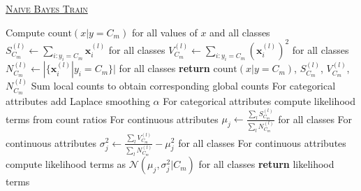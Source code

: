 \documentclass[10pt]{article}
\begin{document}
\begin{algorithm}
	\caption{\underline{\textsc{Naive Bayes Train}}}
	\label{naivebayes_train}
	\begin{algorithmic}[1] %
		 
					\State Compute $\text{count}(x| y=C_m)$ for all values of $x$ and all classes
					\State $S_{C_m}^{(l)} \gets \sum_{i:y_i=C_m} \mathbf{x}^{(l)}_{i}$ for all classes
					\State $V_{C_m}^{(l)} \gets \sum_{i:y_i=C_m} {(\mathbf{x}^{(l)}_{i})}^2$ for all classes
					\State $N_{C_m}^{(l)} \gets |\{\mathbf{x}_i^{(l)}| y_i=C_m \}|$ for all classes
			\EndIf
			\State \textbf{return} $\text{count}(x| y=C_m)$, $S_{C_m}^{(l)}$, $V_{C_m}^{(l)}$, $N_{C_m}^{(l)}$
		\EndProcedure
			\State Sum local counts to obtain corresponding global counts
			\State For categorical attributes add Laplace smoothing $\alpha$
			\State For categorical attributes compute likelihood terms from count ratios
			\State For continuous attributes $\mu_j \gets \frac{\sum_l S_{C_m}^{(l)}}{\sum_l N_{C_m}^{(l)}}$ for all classes
			\State For continuous attributes $\sigma_j^2 \gets \frac{\sum_l V_{C_m}^{(l)}}{\sum_l N_{C_m}^{(l)}} - \mu_{j}^2$ for all classes
			\State For continuous attributes compute likelihood terms as $\mathcal{N}(\mu_j, \sigma_j^2 | C_m)$ for all classes
			\State \textbf{return} likelihood terms
		\EndProcedure
	\end{algorithmic}
\end{algorithm}
\end{document}
